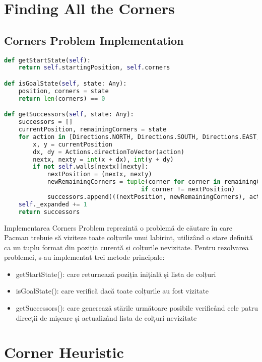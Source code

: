 \documentclass[12pt,a4paper]{article}
\begin{document}
\section{Finding All the Corners}

\subsection{Corners Problem Implementation}
\begin{lstlisting}[language=Python]
def getStartState(self):
    return self.startingPosition, self.corners

def isGoalState(self, state: Any):
    position, corners = state
    return len(corners) == 0

def getSuccessors(self, state: Any):
    successors = []
    currentPosition, remainingCorners = state
    for action in [Directions.NORTH, Directions.SOUTH, Directions.EAST, Directions.WEST]:
        x, y = currentPosition
        dx, dy = Actions.directionToVector(action)
        nextx, nexty = int(x + dx), int(y + dy)
        if not self.walls[nextx][nexty]:
            nextPosition = (nextx, nexty)
            newRemainingCorners = tuple(corner for corner in remainingCorners 
                                      if corner != nextPosition)
            successors.append(((nextPosition, newRemainingCorners), action, 1))
    self._expanded += 1	
    return successors
\end{lstlisting}

Implementarea Corners Problem reprezintă o problemă de căutare în care Pacman trebuie să viziteze toate colțurile unui labirint, utilizând o stare definită ca un tuplu format din poziția curentă și colțurile nevizitate. Pentru rezolvarea problemei, s-au implementat trei metode principale: 
\begin{itemize}
    \item getStartState(): care returnează poziția inițială și lista de colțuri
    \item isGoalState(): care verifică dacă toate colțurile au fost vizitate
    \item getSuccessors(): care generează stările următoare posibile verificând cele patru direcții de mișcare și actualizând lista de colțuri nevizitate
\end{itemize}


\section{Corner Heuristic}
\end{document}
